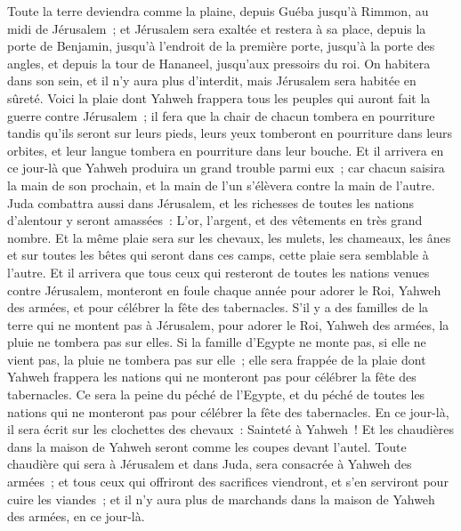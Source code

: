 \begin{multicols}{2}
Toute la terre deviendra comme la plaine, depuis Guéba jusqu'à Rimmon, au midi de Jérusalem~; et Jérusalem sera exaltée et restera à sa place, depuis la porte de Benjamin, jusqu'à l'endroit de la première porte, jusqu'à la porte des angles, et depuis la tour de Hananeel, jusqu'aux pressoirs du roi.
On habitera dans son sein, et il n'y aura plus d'interdit, mais Jérusalem sera habitée en sûreté.
Voici la plaie dont Yahweh frappera tous les peuples qui auront fait la guerre contre Jérusalem~; il fera que la chair de chacun tombera en pourriture tandis qu'ils seront sur leurs pieds, leurs yeux tomberont en pourriture dans leurs orbites, et leur langue tombera en pourriture dans leur bouche.
Et il arrivera en ce jour-là que Yahweh produira un grand trouble parmi eux~; car chacun saisira la main de son prochain, et la main de l'un s'élèvera contre la main de l'autre.
Juda combattra aussi dans Jérusalem, et les richesses de toutes les nations d'alentour y seront amassées~: L'or, l'argent, et des vêtements en très grand nombre.
Et la même plaie sera sur les chevaux, les mulets, les chameaux, les ânes et sur toutes les bêtes qui seront dans ces camps, cette plaie sera semblable à l'autre.
Et il arrivera que tous ceux qui resteront de toutes les nations venues contre Jérusalem, monteront en foule chaque année pour adorer le Roi, Yahweh des armées, et pour célébrer la fête des tabernacles.
S'il y a des familles de la terre qui ne montent pas à Jérusalem, pour adorer le Roi, Yahweh des armées, la pluie ne tombera pas sur elles.
Si la famille d'Egypte ne monte pas, si elle ne vient pas, la pluie ne tombera pas sur elle~; elle sera frappée de la plaie dont Yahweh frappera les nations qui ne monteront pas pour célébrer la fête des tabernacles.
Ce sera la peine du péché de l'Egypte, et du péché de toutes les nations qui ne monteront pas pour célébrer la fête des tabernacles.
En ce jour-là, il sera écrit sur les clochettes des chevaux~: Sainteté à Yahweh~! Et les chaudières dans la maison de Yahweh seront comme les coupes devant l'autel.
Toute chaudière qui sera à Jérusalem et dans Juda, sera consacrée à Yahweh des armées~; et tous ceux qui offriront des sacrifices viendront, et s'en serviront pour cuire les viandes~; et il n'y aura plus de marchands dans la maison de Yahweh des armées, en ce jour-là.
\PPE{}
\end{multicols}
